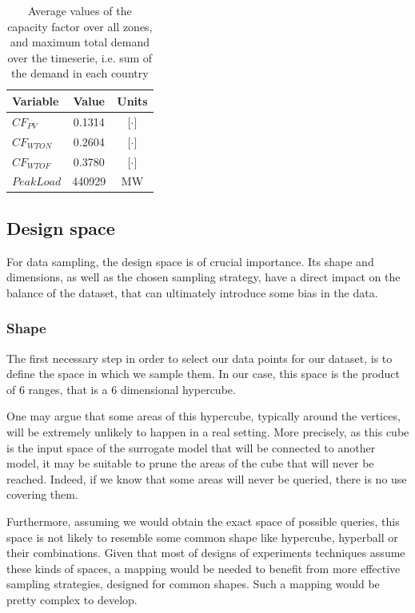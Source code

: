 \begin{table}[h]
    \centering
    \begin{tabular}{|l c c|}
        \hline
        Variable     & Value  & Units \\ \hline
        $CF_{PV}$    & 0.1314 & [$\cdot$]    \\
        $CF_{WTON}$  & 0.2604 & [$\cdot$]    \\
        $CF_{WTOF}$  & 0.3780 & [$\cdot$]    \\ 
        $PeakLoad$   & 440929 & MW    \\ \hline
    \end{tabular}
    \caption{Average values of the capacity factor over all zones, and maximum total demand over the timeserie, i.e. sum of the demand in each country}
    \label{table:param-values}
\end{table}

\subsection{Design space}

For data sampling, the design space is of crucial importance. Its shape and dimensions, as well as the chosen sampling strategy, have a direct impact on the balance of the dataset, that can ultimately introduce some bias in the data. 

\subsubsection{Shape}

The first necessary step in order to select our data points for our dataset, is to define the space in which we sample them. In our case, this space is the product of 6 ranges, that is a 6 dimensional hypercube. 

One may argue that some areas of this hypercube, typically around the vertices, will be extremely unlikely to happen in a real setting. More precisely, as this cube is the input space of the surrogate model that will be connected to another model, it may be suitable to prune the areas of the cube that will never be reached. Indeed, if we know that some areas will never be queried, there is no use covering them.

Furthermore, assuming we would obtain the exact space of possible queries, this space is not likely to resemble some common shape like hypercube, hyperball or their combinations. Given that most of designs of experiments techniques assume these kinds of spaces, a mapping would be needed to benefit from more effective sampling strategies, designed for common shapes. Such a mapping would be pretty complex to develop.

